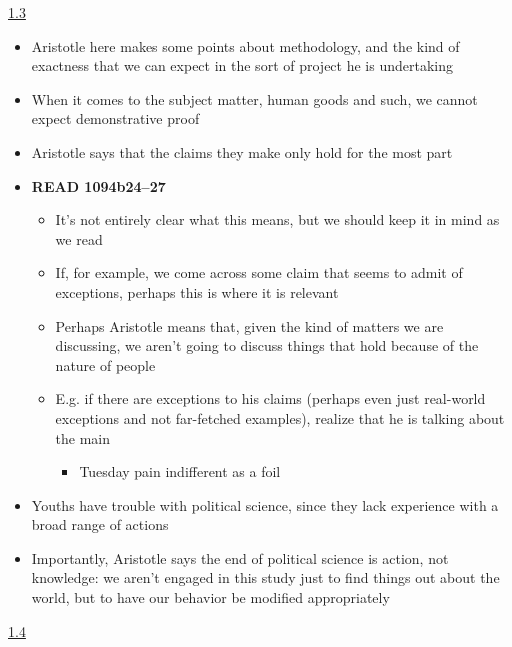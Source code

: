 \documentclass[11pt]{article}
\begin{document}
\noindent\underline{1.3}

\begin{itemize}

\item{Aristotle here makes some points about methodology, and the kind of exactness that we can expect in the sort of project he is undertaking}\item{When it comes to the subject matter, human goods and such, we cannot expect demonstrative proof}\item{Aristotle says that the claims they make only hold for the most part}\item{\textbf{READ 1094b24--27}}\begin{itemize}\item{It's not entirely clear what this means, but we should keep it in mind as we read}\item{If, for example, we come across some claim that seems to admit of exceptions, perhaps this is where it is relevant}\item{Perhaps Aristotle means that, given the kind of matters we are discussing, we aren't going to discuss things that hold because of the nature of people}\item{E.g. if there are exceptions to his claims (perhaps even just real-world exceptions and not far-fetched examples), realize that he is talking about the main}\begin{itemize}\item{Tuesday pain indifferent as a foil}\end{itemize}\end{itemize}

\item{Youths have trouble with political science, since they lack experience with a broad range of actions}\item{Importantly, Aristotle says the end of political science is action, not knowledge: we aren't engaged in this study just to find things out about the world, but to have our behavior be modified appropriately}

\end{itemize}

\noindent\underline{1.4}
\end{document}

